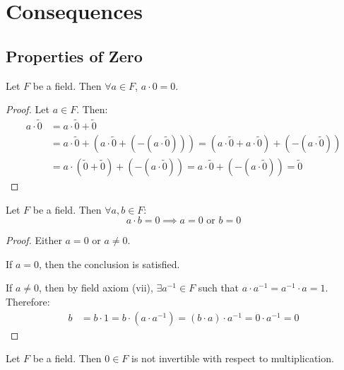 \section{Consequences}

\subsection{Properties of Zero}

\begin{proposition}\label{prop:zero-multiplication}
    Let $F$ be a field. Then $\forall a \in F$, $a \cdot 0 = 0$.
\end{proposition}

\begin{proof}
    Let $a \in F$. Then:
    \begin{align*}
    a \cdot \tilde{0} &= a \cdot \tilde{0} + \tilde{0} \\
    &= a \cdot \tilde{0} + \left(a \cdot \tilde{0} + \left(-\left(a \cdot \tilde{0}\right)\right)\right) = \left(a \cdot \tilde{0} + a \cdot \tilde{0}\right) + \left(-\left(a \cdot \tilde{0}\right)\right) \\
    &= a \cdot (\tilde{0} + \tilde{0}) + \left(-\left(a \cdot \tilde{0}\right)\right) = a \cdot \tilde{0} + \left(-\left(a \cdot \tilde{0}\right)\right) = \tilde{0}
    \end{align*}
\end{proof}
\begin{proposition}\label{prop:zero-product}
    Let $F$ be a field. Then $\forall a, b \in F$:
    \[
        a \cdot b = 0 \implies a = 0 \text{ or } b = 0
    \]
\end{proposition}

\begin{proof}
    Either $a = 0$ or $a \neq 0$.
    
    If $a = 0$, then the conclusion is satisfied.
    
    If $a \neq 0$, then by field axiom (vii), $\exists a^{-1} \in F$ such that $a \cdot a^{-1} = a^{-1} \cdot a = 1$. Therefore:
    \begin{align*}
        b &= b \cdot 1 = b \cdot (a \cdot a^{-1}) = (b \cdot a) \cdot a^{-1} = 0 \cdot a^{-1} = 0
    \end{align*}
\end{proof}

\begin{proposition}\label{prop:zero-non-invertible}
    Let $F$ be a field. Then $0 \in F$ is not invertible with respect to multiplication.
\end{proposition}


